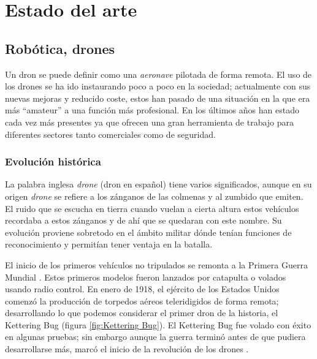\chapter{Estado del arte}\label{sec:Estado_arte}
\section{Robótica, drones}
Un dron se puede definir como una \textit{aeronave} pilotada de forma remota. El uso de los drones se ha ido instaurando poco a poco en la sociedad; actualmente con sus nuevas mejoras y reducido coste, estos han pasado de una situación en la que era más “amateur” a una función más profesional. En los últimos años han estado cada vez más presentes ya que ofrecen una gran herramienta de trabajo para diferentes sectores tanto comerciales como de seguridad. 

\subsection{Evolución histórica}
La palabra inglesa \textit{drone} (dron en español) tiene varios significados, aunque en su origen \textit{drone} se refiere a los zánganos de las colmenas y al zumbido que emiten. El ruido que se escucha en tierra cuando vuelan a cierta altura estos vehículos recordaba a estos zánganos y de ahí que se quedaran con este nombre. Su evolución proviene sobretodo en el ámbito militar dónde tenían funciones de reconocimiento y permitían tener ventaja en la batalla.\newline 

El inicio de los primeros vehículos no tripulados se remonta a la Primera Guerra Mundial . Estos primeros modelos fueron lanzados por catapulta o volados usando radio control. En enero de 1918, el ejército de los Estados Unidos comenzó la producción de torpedos aéreos teleridigidos de forma remota; desarrollando lo que podemos considerar el primer dron de la historia, el Kettering Bug (figura \ref{fig:Kettering Bug}). El Kettering Bug fue volado con éxito en algunas pruebas; sin embargo aunque la guerra terminó antes de que pudiera desarrollarse más, marcó el inicio de la revolución de los drones . \newline 

